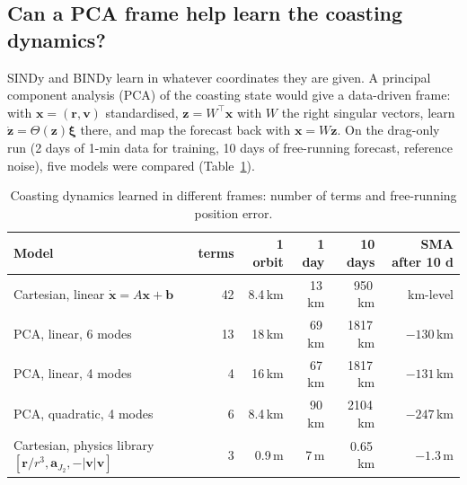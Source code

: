 \documentclass[11pt,a4paper]{article}
\begin{document}
\subsection{Can a PCA frame help learn the coasting dynamics?}\label{sec:pca}
SINDy and BINDy learn in whatever coordinates they are given. A principal component analysis (PCA) of the coasting
state would give a data-driven frame: with $\mathbf x = (\mathbf r,\mathbf v)$ standardised, $\mathbf z = W^\top\mathbf x$ with
$W$ the right singular vectors, learn $\dot{\mathbf z} = \Theta(\mathbf z)\bm\xi$ there, and map the forecast back with
$\mathbf x = W\mathbf z$. On the drag-only run (2 days of 1-min data for training, 10 days of free-running forecast, reference
noise), five models were compared (Table~\ref{tab:pca}).
\begin{table}[H]\centering\small
\caption{Coasting dynamics learned in different frames: number of terms and free-running position error.}\label{tab:pca}
\begin{tabular}{lrrrrr}
\toprule
Model & terms & 1 orbit & 1 day & 10 days & SMA after 10 d\\\midrule
Cartesian, linear $\dot{\mathbf x} = A\mathbf x + \mathbf b$ & 42 & 8.4\,km & 13\,km & 950\,km & km-level\\
PCA, linear, 6 modes & 13 & 18\,km & 69\,km & 1817\,km & $-130$\,km\\
PCA, linear, 4 modes & 4 & 16\,km & 67\,km & 1817\,km & $-131$\,km\\
PCA, quadratic, 4 modes & 6 & 8.4\,km & 90\,km & 2104\,km & $-247$\,km\\
Cartesian, physics library $[\mathbf r/r^3, \mathbf a_{J_2}, -|\mathbf v|\mathbf v]$ & 3 & 0.9\,m & 7\,m & 0.65\,km & $-1.3$\,m\\
\bottomrule
\end{tabular}
\end{table}
\end{document}
